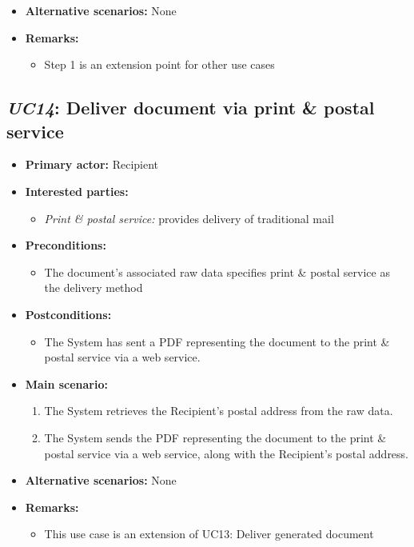 \documentclass[a4paper,10pt]{article}
\begin{document}
\begin{itemize}
    \item \textbf{Alternative scenarios:} 
    None
    
    \item \textbf{Remarks:}
        \begin{itemize}
            \item Step 1 is an extension point for other use cases
        \end{itemize}
\end{itemize}

\subsection{\emph{UC14}: Deliver document via print \& postal service}
\begin{itemize}
    \item \textbf{Primary actor:} Recipient
    \item \textbf{Interested parties:} 
        \begin{itemize}
            \item \textit{Print \& postal service:} provides delivery of traditional mail
        \end{itemize}

    \item \textbf{Preconditions:}
        \begin{itemize}
            \item The document's associated raw data specifies print \& postal service as the delivery method
        \end{itemize}

    \item \textbf{Postconditions:}
        \begin{itemize}
            \item The System has sent a PDF representing the document to the print \& postal service via a web service.
        \end{itemize}
        
    \item \textbf{Main scenario:} 
    \begin{enumerate}
       \item The System retrieves the Recipient's postal address from the raw data.
       \item The System sends the PDF representing the document to the print \& postal service via a web service, along with the Recipient's postal address.
    \end{enumerate}

    \item \textbf{Alternative scenarios:} 
    None
    
    \item \textbf{Remarks:}
        \begin{itemize}
            \item This use case is an extension of UC13: Deliver generated document
        \end{itemize}
\end{itemize}
\end{document}

